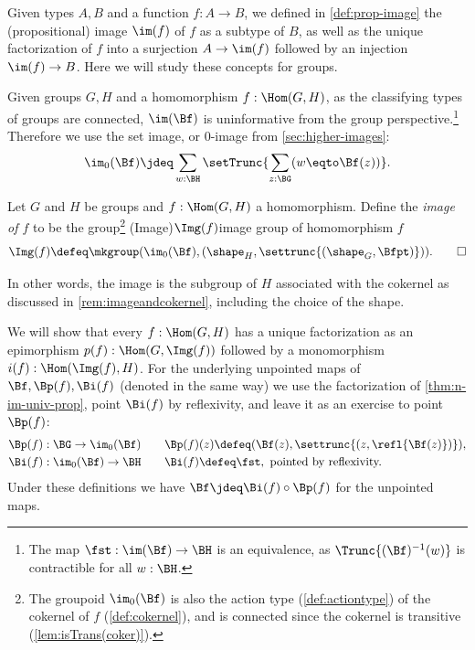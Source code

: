 Given types $A,B$ and a function $f:A\to B$, 
we defined in \cref{def:prop-image}
the (propositional) image $\im(f)$ of $f$ as a subtype of $B$, 
as well as the unique
factorization of $f$ into a surjection $A\to\im(f)$ followed by an
injection $\im(f)\to B$. Here we will study these concepts for groups.

Given groups $G,H$ and a homomorphism $f:\Hom(G,H)$, 
as the classifying types of groups are connected,
$\im(\Bf)$ is uninformative from the group perspective.\footnote{%
The map $\fst: \im(\Bf)\to\BH$ is an equivalence, as $\Trunc{(\Bf)^{-1}(w)}$
is contractible for all $w:\BH$.}
Therefore we use the set image, or $0$-image from \cref{sec:higher-images}:
\[\im_0(\Bf) \jdeq
\sum_{w:\BH}\setTrunc{\sum_{z:\BG}(w\eqto\Bf(z))}.
\] 

\begin{definition}\label{def:Im(grphom)}
Let $G$ and $H$ be groups and $f:\Hom(G,H)$ a homomorphism. Define
the \emph{image of $f$} to be the group\footnote{%
The groupoid $\im_0(\Bf)$ is also the action type (\cref{def:actiontype})
of the cokernel of $f$ (\cref{def:cokernel}), and is connected
since the cokernel is transitive (\cref{lem:isTrans(coker)}).}
\glossary(Image){$\protect\Img(f)$}{image group of homomorphism $f$}
\[
\Img(f)\defeq\mkgroup({\im_0(\Bf)},
(\sh_{H},\settrunc{(\sh_G,\Bfpt)})).\qedhere
\]
\end{definition}
In other words, the image is the subgroup of $H$ associated with the 
cokernel as discussed in \cref{rem:imageandcokernel},
including the choice of the shape.

We will show that every $f:\Hom(G,H)$ has a unique factorization as
an epimorphism $p(f):\Hom(G,\Img(f))$ followed by a monomorphism
$i(f):\Hom(\Img(f),H)$. For the underlying unpointed maps 
of $\Bf,\Bp(f),\Bi(f)$ (denoted in the same way)
we use the factorization of \cref{thm:n-im-univ-prop},
point $\Bi(f)$ by reflexivity, and leave it as an exercise
to point $\Bp(f)$:
\begin{align*}
\Bp(f):\BG\to\im_0(\Bf)&\qquad 
\Bp(f)(z)\defeq(\Bf(z),\settrunc{(z,\refl{\Bf(z)})}),\\
\Bi(f):\im_0(\Bf)\to\BH&\qquad 
\Bi(f)\defeq\fst,\text{ pointed by reflexivity.}
\end{align*}
\noindent
Under these definitions we have $\Bf\jdeq\Bi(f)\circ\Bp(f)$ for the unpointed maps.

